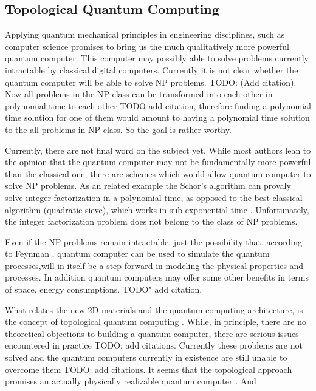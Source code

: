 \subsection*{Topological Quantum Computing}

Applying quantum mechanical principles in engineering disciplines, such as computer science \cite{FQC} promises to bring us the much qualitatively more powerful quantum computer. This computer may possibly able to solve problems currently intractable by classical digital computers. Currently it is not clear whether the quantum computer will be able to solve NP problems. TODO: (Add citation). Now all problems in the NP class can be transformed into each other in polynomial time to each other TODO add citation,  therefore finding a polynomial time solution for one of them would amount to having a polynomial time solution to the all problems in NP class. So the goal is rather worthy.

Currently, there are not final word on the subject yet. While most authors lean to the opinion that the quantum computer may not be fundamentally more powerful than the classical one, there are schemes \cite{NLQC} which would allow quantum computer to solve NP problems. As an related example the Schor's algorithm \cite{Schor} can provaly solve integer factorization in a polynomial time, as opposed to the best classical algorithm (quadratic sieve), which works in sub-exponential time \cite{Pomerance}. Unfortunately, the integer factorization problem does not belong to the class of NP problems. 

Even if the NP problems remain intractable, just the possibility that, according to Feynman \cite{FQC}, quantum computer can be used to simulate the quantum processes,will in itself be a step forward in modeling the physical properties and processes. In addition quantum computers may offer some other benefits in terms of space, energy consumptions. TODO" add citation.

What relates the new 2D materials and the quantum computing architecture, is the concept of topological quantum computing \cite{Tqc1}.  While, in principle, there are no theoretical objections to building a quantum computer, there are serious issues encountered in practice TODO: add citations. Currently these problems are not solved and the quantum computers currently in existence are still unable to overcome them TODO: add citations.
It seems that the topological approach promises an actually physically realizable quantum computer \cite{Tqc2,Tqc3}. And 


